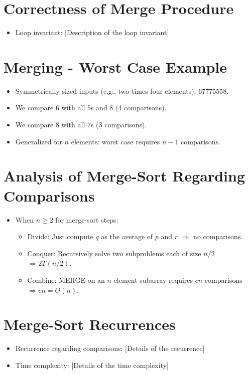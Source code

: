 \documentclass[12pt,openany]{book}
\theoremstyle{definition}
\begin{document}
	\section{Correctness of Merge Procedure}
	\begin{itemize}
		\item Loop invariant: [Description of the loop invariant]
	\end{itemize}
	
	\section{Merging - Worst Case Example}
	\begin{itemize}
		\item Symmetrically sized inputs (e.g., two times four elements): 67775558.
		\item We compare 6 with all 5s and 8 (4 comparisons).
		\item We compare 8 with all 7s (3 comparisons).
		\item Generalized for \( n \) elements: worst case requires \( n - 1 \) comparisons.
	\end{itemize}
	
	\section{Analysis of Merge-Sort Regarding Comparisons}
	\begin{itemize}
		\item When \( n \geq 2 \) for merge-sort steps:
		\begin{itemize}
			\item Divide: Just compute \( q \) as the average of \( p \) and \( r \) \( \Rightarrow \) no comparisons.
			\item Conquer: Recursively solve two subproblems each of size \( n/2 \) \( \Rightarrow 2T(n/2) \).
			\item Combine: MERGE on an \( n \)-element subarray requires \( cn \) comparisons \( \Rightarrow cn = \Theta(n) \).
		\end{itemize}
	\end{itemize}
	
	\section{Merge-Sort Recurrences}
	\begin{itemize}
		\item Recurrence regarding comparisons: [Details of the recurrence]
		\item Time complexity: [Details of the time complexity]
	\end{itemize}
	
\end{document}
